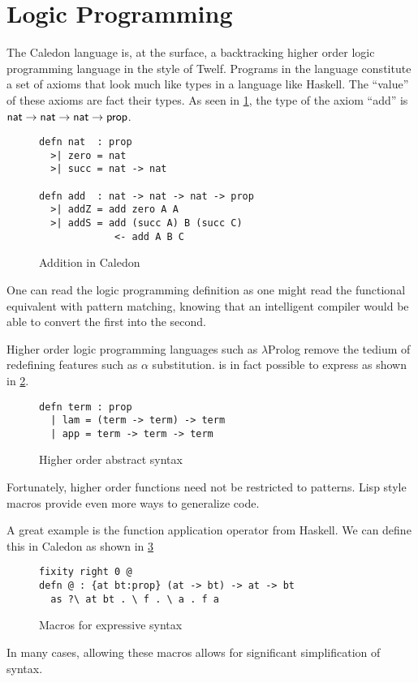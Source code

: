 
\section{Logic Programming}

The Caledon language is, at the surface, a backtracking higher order logic programming language in the style of Twelf.  
Programs in the language constitute a set of axioms that look much like types in a language like Haskell.  The ``value'' of these axioms are fact 
their types. As seen in \ref{code:add}, the type of the axiom ``add'' is $\mathsf{nat} \rightarrow \mathsf{nat} \rightarrow \mathsf{nat} \rightarrow \mathsf{prop}$. 

\begin{figure}[H]
\begin{lstlisting}
defn nat  : prop 
  >| zero = nat
  >| succ = nat -> nat

defn add  : nat -> nat -> nat -> prop
  >| addZ = add zero A A
  >| addS = add (succ A) B (succ C) 
             <- add A B C
\end{lstlisting}
\caption{Addition in Caledon}
\label{code:add}
\end{figure}

One can read the logic programming definition as one might read the functional equivalent with pattern
matching, knowing that an intelligent compiler would be able to convert the first into the second.  

Higher order logic programming languages such as $\lambda$Prolog remove the tedium of redefining features such as $\alpha$ substitution.
is in fact possible to express as shown in \ref{code:lprolog}.

\begin{figure}[H]
\begin{lstlisting}
defn term : prop
  | lam = (term -> term) -> term
  | app = term -> term -> term
\end{lstlisting}
\caption{Higher order abstract syntax}
\label{code:lprolog}
\end{figure}

Fortunately, higher order functions need not be restricted to patterns.  Lisp style macros provide even more ways
to generalize code.  

A great example is the function application operator from Haskell.  
We can define this in Caledon as shown in \ref{code:macros}

\begin{figure}[H]
\begin{lstlisting}
fixity right 0 @
defn @ : {at bt:prop} (at -> bt) -> at -> bt
  as ?\ at bt . \ f . \ a . f a

\end{lstlisting}
\caption{Macros for expressive syntax}
\label{code:macros}
\end{figure}

In many cases, allowing these macros allows for significant simplification of syntax.
